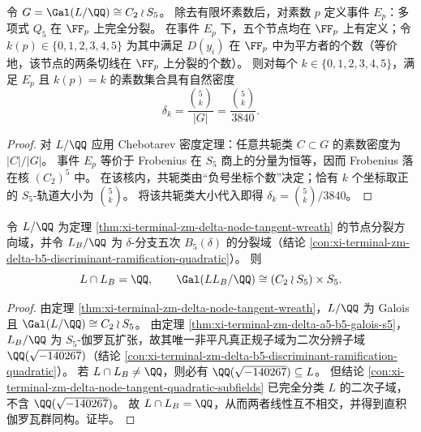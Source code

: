 \begin{corollary}\label{cor:xi-terminal-zm-delta-node-tangent-chebotarev}
令 \(G=\Gal(L/\QQ)\cong C_2\wr S_5\)。
除去有限坏素数后，对素数 \(p\) 定义事件 \(E_p\)：多项式 \(Q_5\) 在 \(\FF_p\) 上完全分裂。
在事件 \(E_p\) 下，五个节点均在 \(\FF_p\) 上有定义；令 \(k(p)\in\{0,1,2,3,4,5\}\) 为其中满足 \(D(y_i)\) 在 \(\FF_p\) 中为平方者的个数（等价地，该节点的两条切线在 \(\FF_p\) 上分裂的个数）。
则对每个 \(k\in\{0,1,2,3,4,5\}\)，满足 \(E_p\) 且 \(k(p)=k\) 的素数集合具有自然密度
\[
\delta_k=\frac{\binom{5}{k}}{|G|}=\frac{\binom{5}{k}}{3840}.
\]
\end{corollary}
\begin{proof}
对 \(L/\QQ\) 应用 Chebotarev 密度定理：任意共轭类 \(C\subset G\) 的素数密度为 \(|C|/|G|\)。
事件 \(E_p\) 等价于 Frobenius 在 \(S_5\) 商上的分量为恒等，因而 Frobenius 落在核 \((C_2)^5\) 中。
在该核内，共轭类由“负号坐标个数”决定；恰有 \(k\) 个坐标取正的 \(S_5\)-轨道大小为 \(\binom{5}{k}\)。
将该共轭类大小代入即得 \(\delta_k=\binom{5}{k}/3840\)。
\end{proof}

\begin{conclusion}\label{con:xi-terminal-zm-delta-node-tangent-b5-linearly-disjoint}
令 \(L/\QQ\) 为定理 \ref{thm:xi-terminal-zm-delta-node-tangent-wreath} 的节点分裂方向域，并令 \(L_B/\QQ\) 为 \(\delta\)-分支五次 \(B_5(\delta)\) 的分裂域（结论 \ref{con:xi-terminal-zm-delta-b5-discriminant-ramification-quadratic}）。
则
\[
L\cap L_B=\QQ,
\qquad
\Gal(LL_B/\QQ)\cong (C_2\wr S_5)\times S_5.
\]
\end{conclusion}
\begin{proof}
由定理 \ref{thm:xi-terminal-zm-delta-node-tangent-wreath}，\(L/\QQ\) 为 Galois 且 \(\Gal(L/\QQ)\cong C_2\wr S_5\)。
由定理 \ref{thm:xi-terminal-zm-delta-a5-b5-galois-s5}，\(L_B/\QQ\) 为 \(S_5\)-伽罗瓦扩张，故其唯一非平凡真正规子域为二次分辨子域
\(\QQ(\sqrt{-140267})\)（结论 \ref{con:xi-terminal-zm-delta-b5-discriminant-ramification-quadratic}）。
若 \(L\cap L_B\neq \QQ\)，则必有 \(\QQ(\sqrt{-140267})\subseteq L\)。
但结论 \ref{con:xi-terminal-zm-delta-node-tangent-quadratic-subfields} 已完全分类 \(L\) 的二次子域，不含 \(\QQ(\sqrt{-140267})\)。
故 \(L\cap L_B=\QQ\)，从而两者线性互不相交，并得到直积伽罗瓦群同构。证毕。
\end{proof}

